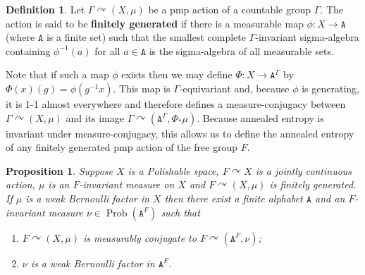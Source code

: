 \documentclass[11pt]{amsart}
\newtheorem{proposition}[theorem]{Proposition}
\theoremstyle{definition}
\newtheorem{definition}[theorem]{Definition}
\theoremstyle{remark}
\newcommand{\G}{\Gamma}
\newcommand{\Prob}{\operatorname{Prob}}
\def\cc{{\curvearrowright}}
\begin{document}
\begin{definition}
Let $\G \cc (X,\mu)$ be a pmp action of a countable group $\G$. The action is said to be \textbf{finitely generated} if there is a measurable map $\phi:X \to \mathtt{A}$ (where $\mathtt{A}$ is a finite set) such that the smallest complete $\G$-invariant sigma-algebra containing $\phi^{-1}(a)$ for all $a\in \mathtt{A}$ is the sigma-algebra of all measurable sets.

Note that if such a map $\phi$ exists then we may define $\Phi:X \to \mathtt{A}^\G$ by $\Phi(x)(g) = \phi(g^{-1}x)$. This map is $\G$-equivariant and, because $\phi$ is generating, it is 1-1 almost everywhere and therefore defines a measure-conjugacy between $\G \cc (X,\mu)$ and its image $\G \cc (\mathtt{A}^\G, \Phi_*\mu)$. Because annealed entropy is invariant under measure-conjugacy, this allows us to define the annealed entropy of any finitely generated pmp action of the free group $F$.
\end{definition}


\begin{proposition}\label{P:weakBernoullifactor1}
Suppose $X$ is a Polishable space, $F \cc X$ is a jointly continuous action, $\mu$ is an $F$-invariant measure on $X$ and $F \cc (X,\mu)$ is finitely generated. If $\mu$ is a weak Bernoulli factor in $X$ then there exist a finite alphabet $\mathtt{A}$ and an $F$-invariant measure $\nu \in \Prob(\mathtt{A}^F)$ such that 
\begin{enumerate}
    \item $F \cc (X,\mu)$ is measurably conjugate to $F \cc (\mathtt{A}^F, \nu)$;
    \item $\nu$ is a weak Bernoulli factor in $\mathtt{A}^F$. 
\end{enumerate}
\end{proposition}
\end{document}
